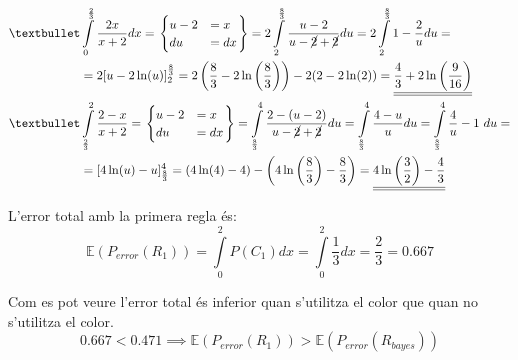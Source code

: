 \documentclass[a4paper]{article}
\begin{document}
\begin{align*}
\textbullet 
&\int\limits_{0}^{\frac{2}{3}} \frac{2x}{x + 2} dx =
\begin{rcases}
\begin{cases}
u - 2 &= x  \\
du &= dx
\end{cases}
\end{rcases} =
2 \int\limits_{2}^{\frac{8}{3}} \frac{u - 2}{u - \cancel{2} + \cancel{2}} du = 
2 \int\limits_{2}^{\frac{8}{3}}  1 -\frac{2}{u} du = \\
&= 2 [u - 2\ln(u)]_2^{\frac{8}{3}} = 
2 \left( \frac{8}{3} - 2\ln\left( \frac{8}{3} \right) \right) - 2 (2 - 2\ln(2)) =
\underline{\underline{\frac{4}{3} + 2\ln\left(\frac{9}{16}\right)}} \\
\textbullet & 
\int\limits_{\frac{2}{3}}^{2} \frac{2 - x}{x + 2} = 
\begin{rcases}
\begin{cases}
u - 2 &= x  \\
du &= dx
\end{cases}
\end{rcases} =
\int\limits_{\frac{8}{3}}^4 \frac{2 - (u - 2)}{u - \cancel{2} + \cancel{2}} du =
\int\limits_{\frac{8}{3}}^4 \frac{4 - u}{u} du =
\int\limits_{\frac{8}{3}}^4 \frac{4}{u} - 1 \ du = \\
&= [4\ln(u) - u]_{\frac{8}{3}}^4 = 
(4\ln(4) - 4) - \left( 4\ln\left( \frac{8}{3}\right) - \frac{8}{3} \right) =
\underline{\underline{4\ln\left(\frac{3}{2} \right)- \frac{4}{3}}}
\end{align*}

L'error total amb la primera regla és:
$$
\mathbb{E}(P_{error}(R_1)) = \int\limits_{0}^{2} P(C_1)dx = 
\int\limits_{0}^{2}\frac{1}{3}dx = \boxed{\frac{2}{3} = 0.667}
$$

Com es pot veure l'error total és inferior quan s'utilitza el color que quan no s'utilitza el color.
$$
0.667 < 0.471 \implies 
\mathbb{E}(P_{error}(R_1)) > \mathbb{E}(P_{error}(R_{bayes}))
$$
\end{document}

